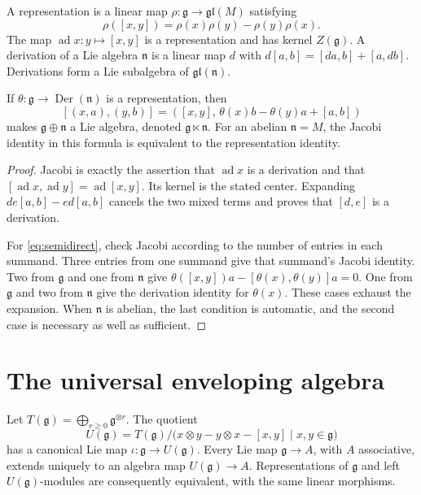 \begin{proposition}
\label{res:A03}
A representation is a linear map
\(\rho:\mathfrak g\to\mathfrak{gl}(M)\) satisfying
\[
 \rho([x,y])=\rho(x)\rho(y)-\rho(y)\rho(x).
\]
The map \(\operatorname{ad}x:y\mapsto[x,y]\) is a representation and
has kernel \(Z(\mathfrak g)\). A derivation of a Lie algebra
\(\mathfrak n\) is a linear map \(d\) with
\(d[a,b]=[da,b]+[a,db]\). Derivations form a Lie subalgebra of
\(\mathfrak{gl}(\mathfrak n)\).

If \(\theta:\mathfrak g\to\operatorname{Der}(\mathfrak n)\) is a
representation, then
\[
 [(x,a),(y,b)]
   =([x,y],\,\theta(x)b-\theta(y)a+[a,b])
 \tag{1.1}\label{eq:semidirect}
\]
makes \(\mathfrak g\oplus\mathfrak n\) a Lie algebra, denoted
\(\mathfrak g\ltimes\mathfrak n\). For an abelian \(\mathfrak n=M\),
the Jacobi identity in this formula is equivalent to the
representation identity.
\end{proposition}

\begin{proof}
Jacobi is exactly the assertion that \(\operatorname{ad}x\) is a
derivation and that \([\operatorname{ad}x,\operatorname{ad}y]
=\operatorname{ad}[x,y]\). Its kernel is the stated center.
Expanding \(de[a,b]-ed[a,b]\) cancels the two mixed terms and proves
that \([d,e]\) is a derivation.

For \eqref{eq:semidirect}, check Jacobi according to the number of
entries in each summand. Three entries from one summand give that
summand's Jacobi identity. Two from \(\mathfrak g\) and one from
\(\mathfrak n\) give
\(\theta([x,y])a-[\theta(x),\theta(y)]a=0\). One from
\(\mathfrak g\) and two from \(\mathfrak n\) give the derivation
identity for \(\theta(x)\). These cases exhaust the expansion.
When \(\mathfrak n\) is abelian, the last condition is automatic,
and the second case is necessary as well as sufficient.
\end{proof}

\section{The universal enveloping algebra}

\begin{theorem}\label{res:A04}
Let \(T(\mathfrak g)=\bigoplus_{r\geq0}\mathfrak g^{\otimes r}\).
The quotient
\[
 U(\mathfrak g)=T(\mathfrak g)/
  \bigl(x\otimes y-y\otimes x-[x,y]\mid x,y\in\mathfrak g\bigr)
\]
has a canonical Lie map \(\iota:\mathfrak g\to U(\mathfrak g)\).
Every Lie map \(\mathfrak g\to A\), with \(A\) associative, extends
uniquely to an algebra map \(U(\mathfrak g)\to A\).
Representations of \(\mathfrak g\) and left \(U(\mathfrak g)\)-modules
are consequently equivalent, with the same linear morphisms.
\end{theorem}

